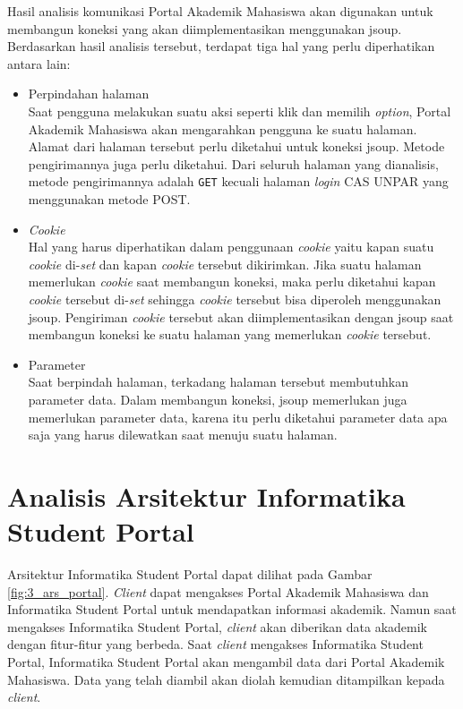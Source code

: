 Hasil analisis komunikasi Portal Akademik Mahasiswa akan digunakan untuk membangun koneksi yang akan diimplementasikan menggunakan jsoup. Berdasarkan hasil analisis tersebut, terdapat tiga hal yang perlu diperhatikan antara lain:
	\begin{itemize}
	\item Perpindahan halaman \\
		Saat pengguna melakukan suatu aksi seperti klik dan memilih \textit{option}, Portal Akademik Mahasiswa akan mengarahkan pengguna ke suatu halaman. Alamat dari halaman tersebut perlu diketahui untuk koneksi jsoup. Metode pengirimannya juga perlu diketahui. Dari seluruh halaman yang dianalisis, metode pengirimannya adalah \texttt{GET} kecuali halaman \textit{login} CAS UNPAR yang menggunakan metode POST.
	\item\textit{Cookie} \\
		Hal yang harus diperhatikan dalam penggunaan \textit{cookie} yaitu kapan suatu \textit{cookie} di-\textit{set} dan kapan \textit{cookie} tersebut dikirimkan. Jika suatu halaman memerlukan \textit{cookie} saat membangun koneksi, maka perlu diketahui kapan \textit{cookie} tersebut di-\textit{set} sehingga \textit{cookie} tersebut bisa diperoleh menggunakan jsoup. Pengiriman \textit{cookie} tersebut akan diimplementasikan dengan jsoup saat membangun koneksi ke suatu halaman yang memerlukan \textit{cookie} tersebut.
	\item Parameter\\
	Saat berpindah halaman, terkadang halaman tersebut membutuhkan parameter data. Dalam membangun koneksi, jsoup memerlukan juga memerlukan parameter data, karena itu perlu diketahui parameter data apa saja yang harus dilewatkan saat menuju suatu halaman.
\end{itemize}

\section{Analisis Arsitektur Informatika Student Portal}
Arsitektur Informatika Student Portal dapat dilihat pada Gambar \ref{fig:3_ars_portal}. \textit{Client} dapat mengakses Portal Akademik Mahasiswa dan Informatika Student Portal untuk mendapatkan informasi akademik. Namun saat mengakses Informatika Student Portal, \textit{client} akan diberikan data akademik dengan fitur-fitur yang berbeda. Saat \textit{client} mengakses Informatika Student Portal, Informatika Student Portal akan mengambil data dari Portal Akademik Mahasiswa. Data yang telah diambil akan diolah kemudian ditampilkan kepada \textit{client}.

